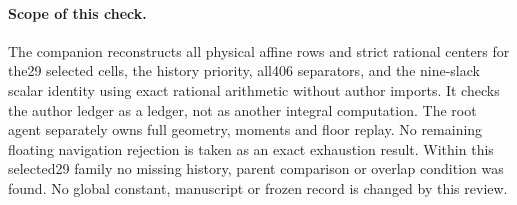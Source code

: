 \paragraph{Scope of this check.}
The companion reconstructs all physical affine rows and strict rational
centers for the29 selected cells, the history priority,
all406 separators, and the nine-slack scalar identity using exact
rational arithmetic without author imports. It checks the author
ledger as a ledger, not as another integral computation. The root
agent separately owns full geometry, moments and floor replay.
No remaining floating navigation rejection is taken as an exact
exhaustion result. Within this selected29 family no missing history,
parent comparison or overlap condition was found. No global constant,
manuscript or frozen record is changed by this review.
